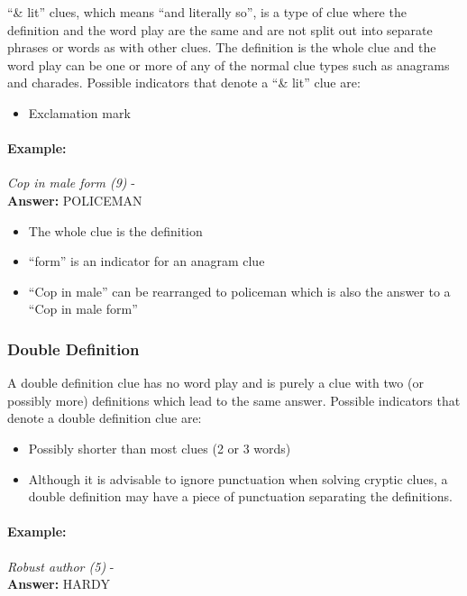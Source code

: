 ``\& lit'' clues, which means ``and literally so'', is a type of clue where the
definition and the word play are the same and are not split out into separate
phrases or words as with other clues. The definition is the whole clue and the
word play can be one or more of any of the normal clue types such as anagrams
and charades. Possible indicators that denote a ``\& lit'' clue are:

\begin{itemize} 
  \item Exclamation mark
\end{itemize}

\paragraph{Example:} \emph{Cop in male form (9)} - \citep{shuchiLit08} \\
\textbf{Answer:} POLICEMAN 

\begin{itemize}
  \item The whole clue is the definition 
  \item ``form'' is an indicator for an anagram clue 
  \item ``Cop in male'' can be rearranged to policeman which is also the answer
        to a ``Cop in male form''
\end{itemize}


\subsubsection{Double Definition}

A double definition clue has no word play and is purely a clue with two (or
possibly more) definitions which lead to the same answer. Possible indicators
that denote a double definition clue are:

\begin{itemize} 
  \item Possibly shorter than most clues (2 or 3 words) 
  \item Although it is advisable to ignore punctuation when solving cryptic 
        clues, a double definition may have a piece of punctuation separating 
        the definitions.
\end{itemize}

\paragraph{Example:} \emph{Robust author (5)}  - \citep{shuchiDouble08} \\
\textbf{Answer:} HARDY 

